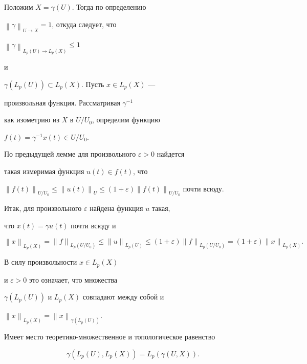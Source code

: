 \begin{pf}


Положим $X=\gamma(U)$. Тогда по определению


${\left\| {\gamma} \right\|}_{U \rightarrow X} =1$, откуда следует, что


${\left\| {\gamma} \right\|}_{L_p(U) \rightarrow L_p(X)} \leq 1$


и


$\gamma (L_p(U)) \subset L_p(X)$. Пусть $x \in L_p(X)$ ---


произвольная функция. Рассматривая $\gamma^{-1}$


как изометрию из $X$ в $U/U_0$, определим функцию


$f(t) = \gamma^{-1}x(t) \in U/U_0$.


По предыдущей лемме для произвольного $\varepsilon > 0$ найдется 


такая измеримая функция $u(t) \in f(t)$, что


${\|f(t)\|}_{U/U_0} \le {\|u(t)\|}_U \le


(1+\varepsilon){\|f(t)\|}_{U/U_0}$ почти всюду.


Итак, для произвольного $\varepsilon$ найдена функция $u$ такая, 


что $x(t) = \gamma u(t)$ почти всюду и


$$


{\left\| {x} \right\|}_{L_p(X)} = {\|f\|}_{L_p(U/U_0)} \le {\|u\|}_{L_p(U)}


\le (1+\varepsilon){\|f\|}_{L_p(U/U_0)} = (1+\varepsilon){\|x\|}_{L_p(X)}.


$$


В силу произвольности $x \in L_p(X)$


и $\varepsilon > 0$ это означает, что множества


$\gamma (L_p(U))$ и $L_p(X)$ совпадают между собой и


${\left\| {x} \right\|}_{L_p(X)} =


{\left\| {x} \right\|}_{\gamma (L_p(U))}$.


\end{pf}





\begin{thms} \label{LpUX}


Имеет место теоретико-множественное и топологическое равенство


$$


\gamma (L_p(U), L_p(X)) = L_p(\gamma (U,X)).


$$


\end{thms}





